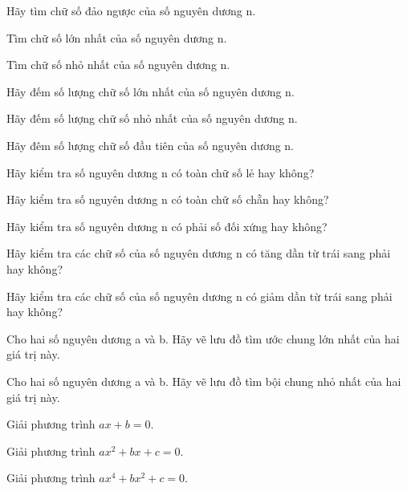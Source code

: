 \begin{problem}
    Hãy tìm chữ số đảo ngược của số nguyên dương n.
\end{problem}

\begin{problem}
    Tìm chữ số lớn nhất của số nguyên dương n.
\end{problem}
\begin{problem}
     Tìm chữ số nhỏ nhất của số nguyên dương n.
\end{problem}
\begin{problem}
    Hãy đếm số lượng chữ số lớn nhất của số nguyên dương n.
\end{problem}
\begin{problem}
     Hãy đếm số lượng chữ số nhỏ nhất của số nguyên dương n.
\end{problem}
\begin{problem}
     Hãy đêm số lượng chữ số đầu tiên của số nguyên dương n.
\end{problem}
\begin{problem}
    Hãy kiểm tra số nguyên dương n có toàn chữ số lẻ hay không?
\end{problem}
\begin{problem}
     Hãy kiểm tra số nguyên dương n có toàn chữ số chẵn hay không?
\end{problem}

\begin{problem}
    Hãy kiểm tra số nguyên dương n có phải số đối xứng hay không?
\end{problem}
\begin{problem}
    Hãy kiểm tra các chữ số của số nguyên dương n có tăng dần từ trái
sang phải hay không?
\end{problem}
\begin{problem}
    Hãy kiểm tra các chữ số của số nguyên dương n có giảm dần từ trái
sang phải hay không?
\end{problem}
\begin{problem}
    Cho hai số nguyên dương a và b. Hãy vẽ lưu đồ tìm ước chung lớn nhất
của hai giá trị này.
\end{problem}
\begin{problem}
    Cho hai số nguyên dương a và b. Hãy vẽ lưu đồ tìm bội chung nhỏ nhất
của hai giá trị này.
\end{problem}

\begin{problem}
    Giải phương trình $𝑎𝑥 + 𝑏 = 0$.
\end{problem}
\begin{problem}
    Giải phương trình $𝑎𝑥^2 + 𝑏𝑥 + 𝑐 = 0$.
\end{problem}
\begin{problem}
    Giải phương trình $𝑎𝑥^4 + 𝑏𝑥^2 + 𝑐 = 0$.
\end{problem}

